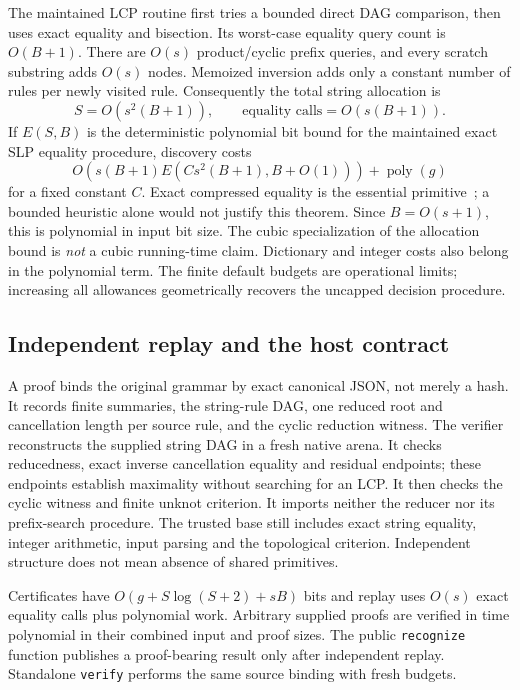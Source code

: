 The maintained LCP routine first tries a bounded direct DAG comparison, then
uses exact equality and bisection. Its worst-case equality query count is
$O(B+1)$. There are $O(s)$ product/cyclic prefix queries, and every scratch
substring adds $O(s)$ nodes. Memoized inversion adds only a constant number
of rules per newly visited rule. Consequently the total string allocation is
\[
 S=O(s^2(B+1)),\qquad
 \text{equality calls}=O(s(B+1)).
\]
If $E(S,B)$ is the deterministic polynomial bit bound for the maintained
exact SLP equality procedure, discovery costs
\[
 O\!\left(s(B+1)E(Cs^2(B+1),B+O(1))\right)
 +\operatorname{poly}(g)
\]
for a fixed constant $C$. Exact compressed equality is the essential
primitive~\cite{schleimer-compressed}; a bounded heuristic alone would not
justify this theorem. Since $B=O(s+1)$, this is polynomial in input bit size.
The cubic specialization of the allocation bound is \emph{not} a cubic
running-time claim. Dictionary and integer costs also belong in the polynomial
term. The finite default budgets are operational limits; increasing all
allowances geometrically recovers the uncapped decision procedure.

\subsection{Independent replay and the host contract}

A proof binds the original grammar by exact canonical JSON, not merely a
hash. It records finite summaries, the string-rule DAG, one reduced root and
cancellation length per source rule, and the cyclic reduction witness.
The verifier reconstructs the supplied string DAG in a fresh native arena.
It checks reducedness, exact inverse cancellation equality and residual
endpoints; these endpoints establish maximality without searching for an
LCP. It then checks the cyclic witness and finite unknot criterion.
It imports neither the reducer nor its prefix-search procedure. The trusted
base still includes exact string equality, integer arithmetic, input parsing
and the topological criterion. Independent structure does not mean absence
of shared primitives.

Certificates have
$O(g+S\log(S+2)+sB)$ bits and replay uses $O(s)$ exact equality calls plus
polynomial work. Arbitrary supplied proofs are verified in time polynomial
in their combined input and proof sizes. The public \texttt{recognize}
function publishes a proof-bearing result only after independent replay.
Standalone \texttt{verify} performs the same source binding with fresh budgets.

